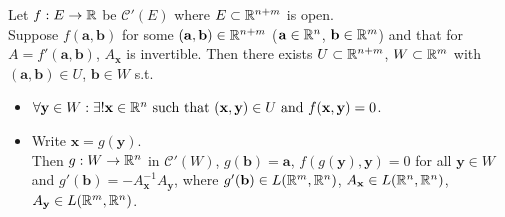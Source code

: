 \begin{thm}
	Let $f: E\to \mathbb{R}$ be $\mathcal{C}'(E)$ where $E \subset \mathbb{R}^{n+m}$ is open.\\
	Suppose $f(\mathbf{a},\mathbf{b})$ for some $(\mathbf{a},\mathbf{b}) \in \mathbb{R}^{n+m}$ ($\mathbf{a} \in \mathbb{R}^{n}$, $\mathbf{b} \in \mathbb{R}^{m}$) and that for $A=f'(\mathbf{a},\mathbf{b})$, $A_{\mathbf{x}}$ is invertible.
	Then there exists $U \subset \mathbb{R}^{n+m}$, $W \subset \mathbb{R}^{m}$ with $(\mathbf{a},\mathbf{b}) \in U$, $\mathbf{b} \in W$ s.t.
	\begin{itemize}
		\item $\forall{\mathbf{y} \in W}: \exists!{\mathbf{x} \in \mathbb{R}^{n}} \text{ such that } (\mathbf{x},\mathbf{y}) \in U \text{ and } f(\mathbf{x},\mathbf{y})=0$.
		\item Write $\mathbf{x}=g(\mathbf{y})$.\\
		      Then $g: W\to \mathbb{R}^{n}$ in $\mathcal{C}'(W)$, $g(\mathbf{b})=\mathbf{a}$, $f(g(\mathbf{y}),\mathbf{y})=0$ for all $\mathbf{y} \in W$ and $g'(\mathbf{b})=-A^{-1}_{\mathbf{x}} A_{\mathbf{y}}$, where $g'(\mathbf{b}) \in L(\mathbb{R}^{m},\mathbb{R}^{n})$, $A_{\mathbf{x}} \in L(\mathbb{R}^{n},\mathbb{R}^{n})$, $A_{\mathbf{y}} \in L(\mathbb{R}^{m},\mathbb{R}^{n})$.
	\end{itemize}
\end{thm}


